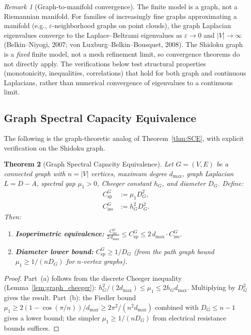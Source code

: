 \documentclass[11pt]{article}
\newtheorem{theorem}{Theorem}[section]
\theoremstyle{definition}
\theoremstyle{remark}
\newtheorem{remark}[theorem]{Remark}
\newcommand{\Csp}{C_{\mathrm{sp}}}
\begin{document}
\begin{remark}[Graph-to-manifold convergence]\label{rem:convergence}
The finite model is a graph, not a Riemannian manifold. For families of increasingly fine graphs approximating a manifold (e.g., $\varepsilon$-neighborhood graphs on point clouds), the graph Laplacian eigenvalues converge to the Laplace--Beltrami eigenvalues as $\varepsilon \to 0$ and $|V| \to \infty$ (Belkin--Niyogi, 2007; von Luxburg--Belkin--Bousquet, 2008). The Shidoku graph is a \emph{fixed} finite model, not a mesh refinement limit, so convergence theorems do not directly apply. The verifications below test structural properties (monotonicity, inequalities, correlations) that hold for both graph and continuous Laplacians, rather than numerical convergence of eigenvalues to a continuous limit.
\end{remark}


\subsection{Graph Spectral Capacity Equivalence}

The following is the graph-theoretic analog of Theorem~\ref{thm:SCE}, with explicit verification on the Shidoku graph.

\begin{theorem}[Graph Spectral Capacity Equivalence]\label{thm:graph_SCE}
Let $G = (V, E)$ be a connected graph with $n = |V|$ vertices, maximum degree $d_{\max}$, graph Laplacian $L = D - A$, spectral gap $\mu_1 > 0$, Cheeger constant $h_G$, and diameter $D_G$. Define:
\begin{align}
\Csp^G &:= \mu_1 D_G^2, \tag{graph spectral capacity} \\
C_{\mathrm{iso}}^G &:= h_G^2 D_G^2. \tag{graph isoperimetric capacity}
\end{align}
Then:
\begin{enumerate}[nosep, label=(\alph*)]
\item \textbf{Isoperimetric equivalence:} $\displaystyle\frac{C_{\mathrm{iso}}^G}{2\,d_{\max}} \le \Csp^G \le 2\,d_{\max}\cdot C_{\mathrm{iso}}^G$.
\item \textbf{Diameter lower bound:} $\Csp^G \ge 1/D_G$ (from the path graph bound $\mu_1 \ge 1/(nD_G)$ for $n$-vertex graphs).
\end{enumerate}
\end{theorem}

\begin{proof}
Part~(a) follows from the discrete Cheeger inequality (Lemma~\ref{lem:graph_cheeger}): $h_G^2/(2d_{\max}) \le \mu_1 \le 2h_G d_{\max}$. Multiplying by $D_G^2$ gives the result. Part~(b): the Fiedler bound $\mu_1 \ge 2(1-\cos(\pi/n))/d_{\max} \ge 2\pi^2/(n^2 d_{\max})$ combined with $D_G \le n-1$ gives a lower bound; the simpler $\mu_1 \ge 1/(nD_G)$ from electrical resistance bounds suffices.
\end{proof}
\end{document}
